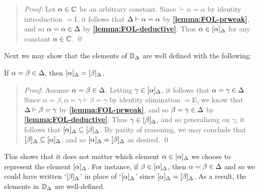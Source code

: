 \begin{quote} 
  \textit{Proof:} 
  Let $\alpha\in\mathbb{C}$ be an arbitrary constant. 
  Since $\vdash \alpha=\alpha$ by identity introduction $=$I, it follows that $\Delta\vdash\alpha=\alpha$ by \textbf{\ref{lemma:FOL-prweak}}, and so $\alpha=\alpha\in\Delta$ by \textbf{\ref{lemma:FOL-deductive}}.
  Thus $\alpha\in[\alpha]_{\Delta}$ for any constant $\alpha\in\mathbb{C}$.
  \qed
\end{quote}

Next we may show that the elements of $\mathbb{D}_{\Delta}$ are well defined with the following: 

\begin{Lthm} \label{lemma:FOL-define}
  If $\alpha=\beta\in\Delta$, then $[\alpha]_{\Delta}=[\beta]_{\Delta}$.
\end{Lthm}

\begin{quote} 
  \textit{Proof:}
  Assume $\alpha=\beta\in\Delta$.
  Letting $\gamma\in[\alpha]_{\Delta}$, it follows that $\alpha=\gamma\in\Delta$.
  Since $\alpha=\beta,\alpha=\gamma\vdash\beta=\gamma$ by identity elimination $=$E, we know that $\Delta\vdash\beta=\gamma$ by \textbf{\ref{lemma:FOL-prweak}}, and so $\beta=\gamma\in\Delta$ by \textbf{\ref{lemma:FOL-deductive}}. 
  Thus $\gamma\in[\beta]_{\Delta}$, and so generalising on $\gamma$, it follows that $[\alpha]_{\Delta}\subseteq[\beta]_{\Delta}$.
  By parity of reasoning, we may conclude that $[\beta]_{\Delta}\subseteq[\alpha]_{\Delta}$, and so $[\alpha]_{\Delta}=[\beta]_{\Delta}$ as desired.
  \qed
\end{quote}

This shows that it does not matter which element $\alpha\in[\alpha]_{\Delta}$ we choose to represent the element $[\alpha]_{\Delta}$.
For instance, if $\beta\in[\alpha]_{\Delta}$, then $\alpha=\beta\in\Delta$ and so we could have written `$[\beta]_{\Delta}$' in place of `$[\alpha]_{\Delta}$' since $[\alpha]_{\Delta}=[\beta]_{\Delta}$.
As a result, the elements in $\mathbb{D}_{\Delta}$ are well-defined. 

